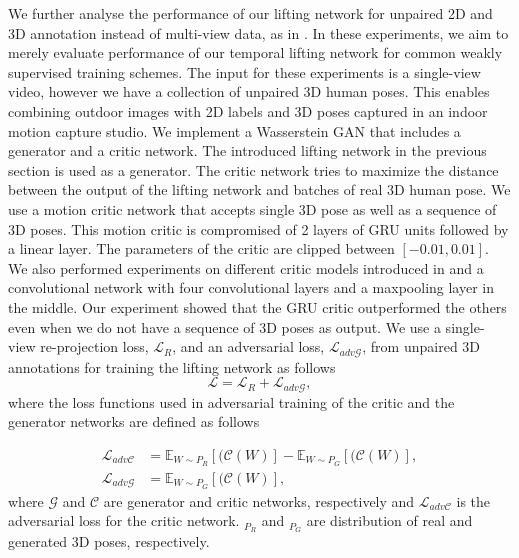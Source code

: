 \documentclass[10pt,twocolumn,letterpaper]{article}
\begin{document}
We further analyse the performance of our lifting network for unpaired 2D and 3D annotation instead of multi-view data, as in \cite{Wandt_2019_CVPR}. In these experiments, we aim to merely evaluate performance of our temporal lifting network for common weakly supervised training schemes. The input for these experiments is a single-view video, however we have a collection of unpaired 3D human poses. This enables combining outdoor images with 2D labels and 3D poses captured in an indoor motion capture studio. We implement a Wasserstein GAN \cite{pmlr-v70-arjovsky17a} that includes a generator and a critic network. The introduced lifting network in the previous section is used as a generator. The critic network tries to maximize the distance between the output of the lifting network and batches of real 3D human pose. We use a motion critic network that accepts single 3D pose as well as a sequence of 3D poses. This motion critic is compromised of 2 layers of GRU units followed by a linear layer. The parameters of the critic are clipped between $[-0.01, 0.01]$. We also performed experiments on different critic models introduced in \cite{Wandt_2019_CVPR} and a convolutional network with four convolutional layers and a maxpooling layer in the middle. Our experiment showed that the GRU critic outperformed the others even when we do not have a sequence of 3D poses as output. We use a single-view re-projection loss, $\mathcal{L}_{R}$, and an adversarial loss, $\mathcal{L}_{adv\mathcal{G}}$, from unpaired 3D annotations for training the lifting network as follows 
\begin{equation}
\mathcal{L}=\mathcal{L}_{R}+\mathcal{L}_{adv\mathcal{G}},
\label{equ:generator_loss}
\end{equation}
where the loss functions used in adversarial training of the critic and the generator networks are defined as follows

\begin{align}
\mathcal{L}_{adv\mathcal{C}} &= \mathbb{E}_{W \sim P_R}[(\mathcal{C}(W)] - \mathbb{E}_{W \sim P_G}[(\mathcal{C}(W)], \\
\mathcal{L}_{adv\mathcal{G}} &= \mathbb{E}_{W \sim P_G}[(\mathcal{C}(W)], 
\label{equ:wasserstein_loss}
\end{align}
where $\mathcal{G}$ and $\mathcal{C}$ are generator and critic networks, respectively and $\mathcal{L}_{adv\mathcal{C}}$ is the adversarial loss for the critic network. $_{P_R}$ and $_{P_G}$ are distribution of real and generated 3D poses, respectively. 
\end{document}
